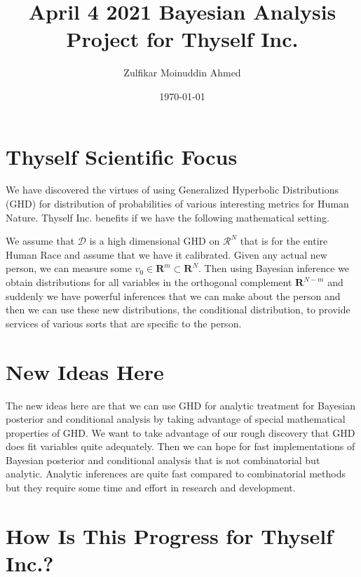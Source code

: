 \documentclass{amsart}
\title{April 4 2021 Bayesian Analysis Project for Thyself Inc.}
\author{Zulfikar Moinuddin Ahmed}
\date{\today}
\begin{document}
\maketitle

\section{Thyself Scientific Focus}

We have discovered the virtues of using Generalized Hyperbolic Distributions (GHD) for distribution of probabilities of various interesting metrics for Human Nature.  Thyself Inc. benefits if we have the following mathematical setting.

We assume that $\mathcal{D}$ is a high dimensional GHD on $\mathcal{R}^N$ that is for the entire Human Race and assume that we have it calibrated.  Given any actual new person, we can measure some $v_0 \in \mathbf{R}^m \subset \mathbf{R}^N$.  Then using Bayesian inference we obtain distributions for all variables in the orthogonal complement $\mathbf{R}^{N-m}$ and suddenly we have powerful inferences that we can make about the person and then we can use these new distributions, the conditional distribution, to provide services of various sorts that are specific to the person.

\section{New Ideas Here}

The new ideas here are that we can use GHD for analytic treatment for Bayesian posterior and conditional analysis by taking advantage of special mathematical properties of GHD.  We want to take advantage of our rough discovery that GHD does fit variables quite adequately.  Then we can hope for fast implementations of Bayesian posterior and conditional analysis that is not combinatorial but analytic.  Analytic inferences are quite fast compared to combinatorial methods but they require some time and effort in research and development.

\section{How Is This Progress for Thyself Inc.?}
\end{document}
